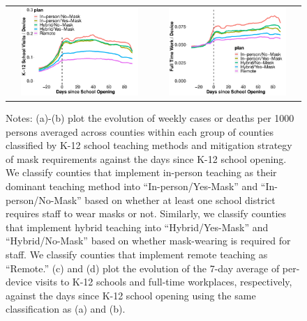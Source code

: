 \documentclass[9pt,twocolumn,twoside,lineno]{pnas-new}
\begin{document}
\begin{figure}[ht]
{\begin{minipage}{0.7\linewidth}
\begin{tabular}{cc}
 \qquad \qquad \qquad\includegraphics[width=0.85\textwidth]{schoolmode-event-school}&
\qquad  \qquad \qquad\includegraphics[width=0.85\textwidth]{schoolmode-event-fullwork}
    \end{tabular}
  \end{minipage}}
\vspace{-0.2cm}  {\scriptsize
\begin{flushleft}
Notes:  (a)-(b) plot the evolution of weekly cases or deaths per 1000 persons averaged across counties within each group of counties classified by K-12 school teaching methods and mitigation strategy of mask requirements against the days since K-12 school opening. We classify counties that implement in-person teaching as their dominant teaching method into ``In-person/Yes-Mask'' and  ``In-person/No-Mask'' based on whether at least one school district requires staff to wear masks or not. Similarly, we classify counties that implement hybrid teaching into ``Hybrid/Yes-Mask'' and  ``Hybrid/No-Mask'' based on whether mask-wearing is required for staff. We classify counties that implement remote teaching as ``Remote.''   (c) and (d) plot the evolution of the 7-day average of per-device visits to K-12 schools and full-time workplaces, respectively, against the days since K-12 school opening using the same classification as (a) and (b).
 \end{flushleft}}
\end{figure}
\end{document}
